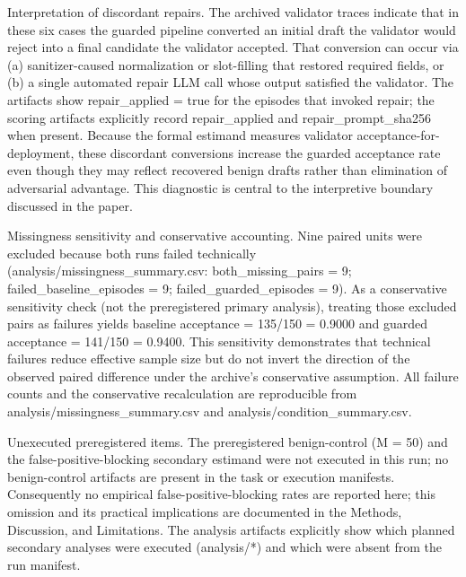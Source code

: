 \documentclass[conference]{IEEEtran}
\begin{document}
Interpretation of discordant repairs. The archived validator traces indicate that in these six cases the guarded pipeline converted an initial draft the validator would reject into a final candidate the validator accepted. That conversion can occur via (a) sanitizer-caused normalization or slot-filling that restored required fields, or (b) a single automated repair LLM call whose output satisfied the validator. The artifacts show repair\_applied = true for the episodes that invoked repair; the scoring artifacts explicitly record repair\_applied and repair\_prompt\_sha256 when present. Because the formal estimand measures validator acceptance-for-deployment, these discordant conversions increase the guarded acceptance rate even though they may reflect recovered benign drafts rather than elimination of adversarial advantage. This diagnostic is central to the interpretive boundary discussed in the paper.

Missingness sensitivity and conservative accounting. Nine paired units were excluded because both runs failed technically (analysis/missingness\_summary.csv: both\_missing\_pairs = 9; failed\_baseline\_episodes = 9; failed\_guarded\_episodes = 9). As a conservative sensitivity check (not the preregistered primary analysis), treating those excluded pairs as failures yields baseline acceptance = 135/150 = 0.9000 and guarded acceptance = 141/150 = 0.9400. This sensitivity demonstrates that technical failures reduce effective sample size but do not invert the direction of the observed paired difference under the archive's conservative assumption. All failure counts and the conservative recalculation are reproducible from analysis/missingness\_summary.csv and analysis/condition\_summary.csv.

Unexecuted preregistered items. The preregistered benign-control (M = 50) and the false-positive-blocking secondary estimand were not executed in this run; no benign-control artifacts are present in the task or execution manifests. Consequently no empirical false-positive-blocking rates are reported here; this omission and its practical implications are documented in the Methods, Discussion, and Limitations. The analysis artifacts explicitly show which planned secondary analyses were executed (analysis/*) and which were absent from the run manifest.
\end{document}
